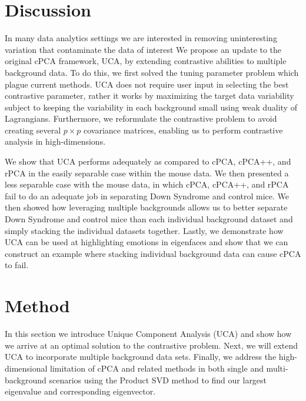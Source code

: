 \documentclass[12pt]{article}
\begin{document}
\section{Discussion}
In many data analytics settings we are interested in removing uninteresting variation that contaminate the data of interest
We propose an update to the original cPCA framework, UCA, by extending contrastive abilities to multiple background data. To do this, we first solved the tuning parameter problem which plague current methods. UCA does not require user input in selecting the best contrastive parameter, rather it works by maximizing the target data variability subject to keeping the variability in each background small using weak duality of Lagrangians. Furthermore, we reformulate the contrastive problem to avoid creating several $p \times p$ covariance matrices, enabling us to perform contrastive analysis in high-dimensions.

We show that UCA performs adequately as compared to cPCA, cPCA++, and rPCA in the easily separable case within the mouse data. We then presented a less separable case with the mouse data, in which cPCA, cPCA++, and rPCA fail to do an adequate job in separating Down Syndrome and control mice.  We then showed how leveraging multiple backgrounds allows us to better separate Down Syndrome and control mice than each individual background dataset and simply stacking the individual datasets together. Lastly, we demonstrate how UCA can be used at highlighting emotions in eigenfaces and show that we can construct an example where stacking individual background data can cause cPCA to fail.



\section{Method}
In this section we introduce Unique Component Analysis (UCA) and show how we arrive at an optimal solution to the contrastive problem. Next, we will extend UCA
to incorporate multiple background data sets. Finally, we address the high-dimensional limitation of cPCA and related methods in both single and multi-background scenarios using the Product SVD method to find our largest eigenvalue and corresponding eigenvector.  
\end{document}

